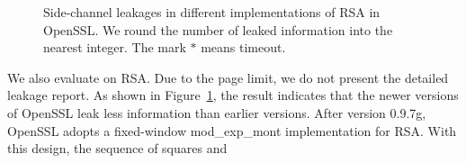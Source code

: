 \begin{figure}
    \caption{Side-channel leakages in different implementations of RSA in OpenSSL\@. 
        We round the number of leaked information into the nearest integer. 
        The mark $*$ means timeout.}
    \label{fig:rsa}
\end{figure}
We also evaluate \tool{} on RSA. Due to the page limit,
we do not present the detailed leakage report. %
 As shown in Figure~\ref{fig:rsa}, the result indicates that the newer
versions of OpenSSL leak less information than earlier
versions. After version 0.9.7g, OpenSSL adopts a fixed-window \textsf{mod\_exp\_mont}
implementation for RSA\@. With this design, the sequence of squares and
